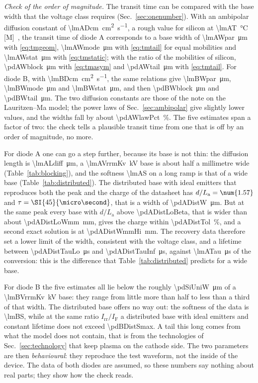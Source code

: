 \documentclass[10pt,a4paper]{scrartcl}
\newcommand{\IF}{I_\mathrm{F}}
\newcommand{\Irr}{I_\mathrm{rr}}
\newcommand{\La}{L_\mathrm{a}}
\begin{document}
\emph{Check of the order of magnitude.} The transit time can be compared with the base width that the voltage class requires (Sec.~\ref{sec:onenumber}). With an ambipolar diffusion constant of \SI{\lmADcm}{\centi\metre\squared\per\second}, a rough value for silicon at \SI{\lmAT}{\celsius} [M]~\cite{lutz}, the transit time of diode A corresponds to a base width of \SI{\lmAWpar}{\micro\metre} with \eqref{eq:tmgeom}, \SI{\lmAWmode}{\micro\metre} with \eqref{eq:tmtail} for equal mobilities and \SI{\lmAWstat}{\micro\metre} with \eqref{eq:tmstatic}; with the ratio of the mobilities of silicon, \SI{\pdAWblock}{\micro\metre} with \eqref{eq:tmasym} and \SI{\pdAWtail}{\micro\metre} with \eqref{eq:tmtail}. For diode B, with \SI{\lmBDcm}{\centi\metre\squared\per\second}, the same relations give \SI{\lmBWpar}{\micro\metre}, \SI{\lmBWmode}{\micro\metre} and \SI{\lmBWstat}{\micro\metre}, and then \SI{\pdBWblock}{\micro\metre} and \SI{\pdBWtail}{\micro\metre}. The two diffusion constants are those of the note on the Lauritzen--Ma model; the power laws of Sec.~\ref{sec:ambipolar} give slightly lower values, and the widths fall by about \SI{\pdAWlawPct}{\percent}. The five estimates span a factor of two: the check tells a plausible transit time from one that is off by an order of magnitude, no more.

For diode A one can go a step further, because its base is not thin: the diffusion length is \SI{\lmALdiff}{\micro\metre}, a \SI{\lmAVrrmKv}{\kilo\volt} base is about half a millimetre wide (Table~\ref{tab:blocking}), and the softness \num{\lmAS} on a long ramp is that of a wide base (Table~\ref{tab:distributed}). The distributed base with ideal emitters that reproduces both the peak and the charge of the datasheet has $d/\La = \num{\pdADistBeta}$ and $\tau = \SI{\pdADistTau}{\micro\second}$, that is a width of \SI{\pdADistW}{\micro\metre}. But at the same peak every base with $d/\La$ above \num{\pdADistLoBeta}, that is wider than about \SI{\pdADistLoWmm}{\milli\metre}, gives the charge within \SI{\pdADistTol}{\percent}, and a second exact solution is at \SI{\pdADistWmmHi}{\milli\metre}. The recovery data therefore set a lower limit of the width, consistent with the voltage class, and a lifetime between \SI{\pdADistTauLo}{\micro\second} and \SI{\pdADistTauInf}{\micro\second}, against \SI{\lmATau}{\micro\second} of the conversion: this is the difference that Table~\ref{tab:distributed} predicts for a wide base.

For diode B the five estimates all lie below the roughly \SI{\pdSiUniW}{\micro\metre} of a \SI{\lmBVrrmKv}{\kilo\volt} base: they range from little more than half to less than a third of that width. The distributed base offers no way out: the softness of the data is \num{\lmBS}, while at the same ratio $\Irr/\IF$ a distributed base with ideal emitters and constant lifetime does not exceed \num{\pdBDistSmax}. A tail this long comes from what the model does not contain, that is from the technologies of Sec.~\ref{sec:technology} that keep plasma on the cathode side. The two parameters are then \emph{behavioural}: they reproduce the test waveform, not the inside of the device. The data of both diodes are assumed, so these numbers say nothing about real parts; they show how the check reads.
\end{document}
